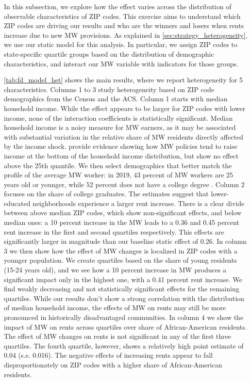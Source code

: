 In this subsection, we explore how the effect varies across the distribution of observable 
characteristics of ZIP codes. This exercise aims to understand which ZIP codes are driving 
our results and who are the winners and losers when rents increase due to new MW provisions. 
As explained in \autoref{sec:strategy_heterogeneity}, we use our static model for this analysis. 
In particular, we assign ZIP codes to state-specific quartile groups based on the distribution of demographic
characteristics, and interact our MW variable with indicators for those groups. 

\autoref{tab:fd_model_het} shows the main results, where we report heterogeneity for 5 
characteristics. Columns 1 to 3 study heterogeneity based on ZIP code demographics from the 
Census and the ACS. Column 1 starts with median household income. While the effect appears to 
be larger for ZIP codes with lower income, none of the interaction coefficients is statistically 
significant. Median household income is a noisy measure for MW earners, as it may be associated 
with substantial variation in the relative share of MW residents directly affected by the income 
shock. \textcite{dube2019minimum} provide evidence showing how MW policies tend to raise income 
at the bottom of the household income distribution, but show no effect above the 25th quantile. 
We then select demographics that better match the profile of the average MW worker: 
in 2019, 43 percent of MW workers are 25 years old 
or younger, while 52 percent does not have a college degree \parencite{bls2019minworkers}. 
Column 2 focuses on the share of college graduates. The estimates suggest that 
lower-educated neighborhoods experience a larger rent increase. There is a clear divide 
between above median ZIP codes, which show non-significant effects, and below median ones:
a 10 percent increase in the  MW leads to a 0.36 and 0.45 percent rent increase in the first and second
quartiles respectively. This effects are significantly larger in magnitude than our baseline static 
effect of 0.26. In column 3 we then show how the effect of MW changes is localized in ZIP codes
with a younger population. We create quartiles based on the share of young residents (15-24 years old), 
and we see how a 10 percent increase in MW produces a significant impact only in the highest one, 
with a 0.41 percent rent increase. We find weakly decreasing and not statistically significant effects
for the remaining quartiles. 
While our results don't show a strong correlation with the distribution of median household income, 
the effects of MW on rents may still be more pronounced in historically disadvantaged communities. 
In column 4 we show the impact of MW on rents across quartiles over share of 
African-American residents. The effect of MW changes on rents is not significant in any of the 
first three quartiles. The fourth quartile, however, shows a relatively high point estimate of 
0.04 (s.e. 0.016). The negative effects of increasing rents appear to fall disproportionately 
on ZIP codes with a higher share of African-American residents. 

